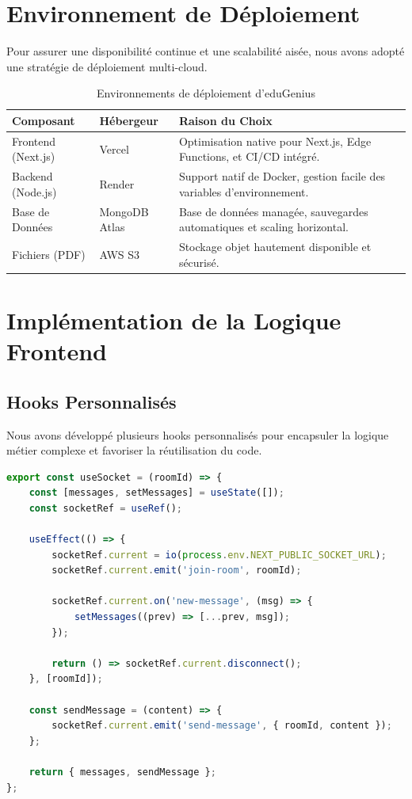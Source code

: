\section{Environnement de Déploiement}
Pour assurer une disponibilité continue et une scalabilité aisée, nous avons adopté une stratégie de déploiement multi-cloud.

\begin{table}[H]
\centering
\begin{tabular}{|l|l|p{8cm}|}
\hline
\textbf{Composant} & \textbf{Hébergeur} & \textbf{Raison du Choix} \\ \hline
Frontend (Next.js) & Vercel & Optimisation native pour Next.js, Edge Functions, et CI/CD intégré. \\ \hline
Backend (Node.js) & Render & Support natif de Docker, gestion facile des variables d'environnement. \\ \hline
Base de Données & MongoDB Atlas & Base de données managée, sauvegardes automatiques et scaling horizontal. \\ \hline
Fichiers (PDF) & AWS S3 & Stockage objet hautement disponible et sécurisé. \\ \hline
\end{tabular}
\caption{Environnements de déploiement d'eduGenius}
\end{table}

\section{Implémentation de la Logique Frontend}
\subsection{Hooks Personnalisés}
Nous avons développé plusieurs hooks personnalisés pour encapsuler la logique métier complexe et favoriser la réutilisation du code.

\begin{lstlisting}[language=JavaScript, caption=Hook personnalisé useSocket pour la gestion du temps réel]
export const useSocket = (roomId) => {
    const [messages, setMessages] = useState([]);
    const socketRef = useRef();

    useEffect(() => {
        socketRef.current = io(process.env.NEXT_PUBLIC_SOCKET_URL);
        socketRef.current.emit('join-room', roomId);

        socketRef.current.on('new-message', (msg) => {
            setMessages((prev) => [...prev, msg]);
        });

        return () => socketRef.current.disconnect();
    }, [roomId]);

    const sendMessage = (content) => {
        socketRef.current.emit('send-message', { roomId, content });
    };

    return { messages, sendMessage };
};
\end{lstlisting}

